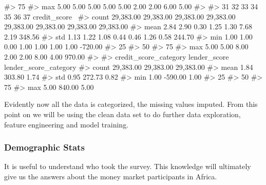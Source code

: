 \begin{Schunk}
\begin{Soutput}
#> 75%
#> max        5.00      5.00      5.00      5.00      5.00      2.00      2.00      6.00      5.00   
#> 
#>              31        32        33        34        35        36        37  credit_score  \
#> count 29,383.00 29,383.00 29,383.00 29,383.00 29,383.00 29,383.00 29,383.00     29,383.00   
#> mean       2.84      2.90      0.30      1.25      1.30      7.68      2.19        348.56   
#> std        1.13      1.22      1.08      0.44      0.46      1.26      0.58        244.70   
#> min        1.00      1.00      0.00      1.00      1.00      1.00      1.00       -720.00   
#> 25%
#> 50%
#> 75%
#> max        5.00      5.00      8.00      2.00      2.00      8.00      4.00        970.00   
#> 
#>        credit_score_category  lender_score  lender_score_category  
#> count              29,383.00     29,383.00              29,383.00  
#> mean                    1.84        303.80                   1.74  
#> std                     0.95        272.73                   0.82  
#> min                     1.00       -590.00                   1.00  
#> 25%
#> 50%
#> 75%
#> max                     5.00        840.00                   5.00
\end{Soutput}
\end{Schunk}

Evidently now all the data is categorized, the missing values imputed.
From this point on we will be using the clean data set to do further
data exploration, feature engineering and model training.

\hypertarget{demographic-stats}{%
\subsubsection{Demographic Stats}\label{demographic-stats}}

It is useful to understand who took the survey. This knowledge will
ultimately give us the answers about the money market participants in
Africa.

